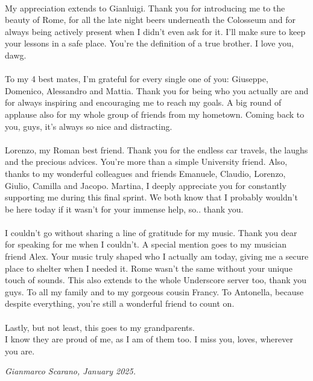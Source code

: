 {    \paragraph{} My appreciation extends to Gianluigi. Thank you for introducing me to the beauty of Rome, for all the late night beers underneath the Colosseum and for always being actively present when I didn't even ask for it. I'll make sure to keep your lessons in a safe place. You're the definition of a true brother. I love you, dawg.
    
    \paragraph{} To my 4 best mates, I'm grateful for every single one of you: Giuseppe, Domenico, Alessandro and Mattia. Thank you for being who you actually are and for always inspiring and encouraging me to reach my goals. A big round of applause also for my whole group of friends from my hometown. Coming back to you, guys, it's always so nice and distracting.
    
    \paragraph{} Lorenzo, my Roman best friend. Thank you for the endless car travels, the laughs and the precious advices. You're more than a simple University friend. Also, thanks to my wonderful colleagues and friends Emanuele, Claudio, Lorenzo, Giulio, Camilla and Jacopo. Martina, I deeply appreciate you for constantly supporting me during this final sprint. We both know that I probably wouldn't be here today if it wasn't for your immense help, so.. thank you.
    
    \paragraph{} I couldn't go without sharing a line of gratitude for my music. Thank you dear for speaking for me when I couldn't. A special mention goes to my musician friend Alex. Your music truly shaped who I actually am today, giving me a secure place to shelter when I needed it. Rome wasn't the same without your unique touch of sounds. This also extends to the whole Underscore server too, thank you guys. To all my family and to my gorgeous cousin Francy. To Antonella, because despite everything, you're still a wonderful friend to count on.
    
    \paragraph{} Lastly, but not least, this goes to my grandparents.\\I know they are proud of me, as I am of them too. I miss you, loves, wherever you are.
    
    \vspace{0.25 cm}
    
    \begin{center}
        \textit{Gianmarco Scarano, January 2025.}
    \end{center}
    
    \begin{center}
    \end{center}
    
    \clearpage
    \restoregeometry
}
